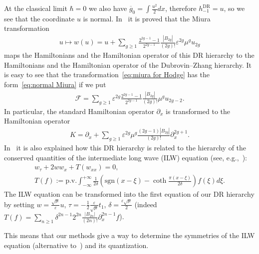 \documentclass[pdftex]{sigma}
\numberwithin{equation}{section}
\newcommand{\og}{\overline g}
\newcommand{\<}{\left<}
\renewcommand{\>}{\right>}
\newcommand{\eps}{\varepsilon}
\newcommand{\DR}{\mathrm{DR}}
\newcommand{\cF}{\mathcal F}
\begin{document}
At the classical limit $\hbar=0$ we also have $\og_0=\int\frac{u^2}{2}dx$, therefore $h_{-1}^\DR=u$, so we see that the coordinate $u$ is normal. In~\cite{Bur15} it is proved that the Miura transformation
\begin{gather}\label{eq:miura for Hodge}
u\mapsto w(u)=u+\sum_{g\ge 1}\frac{2^{2g-1}-1}{2^{2g-1}}\frac{|B_{2g}|}{(2g)!}\eps^{2g}\mu^g u_{2g}
\end{gather}
maps the Hamiltonians and the Hamiltonian operator of this DR hierarchy to the Hamiltonians and the Hamiltonian operator of the Dubrovin--Zhang hierarchy. It is easy to see that the transformation~\eqref{eq:miura for Hodge} has the form~\eqref{eq:normal Miura} if we put
\begin{gather*}
\cF=\sum_{g\ge 1}\eps^{2g}\frac{2^{2g-1}-1}{2^{2g-1}}\frac{|B_{2g}|}{(2g)!}\mu^g u_{2g-2}.
\end{gather*}
In particular, the standard Hamiltonian operator $\partial_x$ is transformed to the Hamiltonian operator
\begin{gather*}
K=\partial_x + \sum_{g\geq 1}\eps^{2g}\mu^g\frac{(2g-1) |B_{2g}|}{(2g)!} \partial_x^{2g+1}.
\end{gather*}
In~\cite{Bur15} it is also explained how this DR hierarchy is related to the hierarchy of the conserved quantities of the intermediate long wave (ILW) equation (see, e.g.,~\cite{SAK79}):
\begin{gather*}
w_\tau + 2 w w_x + T(w_{xx})=0, \\
 T(f):=\mathrm{p.v.}\int_{-\infty}^{+\infty} \frac{1}{2\delta} \left(\mathrm{sgn}(x-\xi) - \coth \frac{\pi (x-\xi)}{2 \delta}\right) f(\xi) d\xi.
\end{gather*}
The ILW equation can be transformed into the f\/irst equation of our DR hierarchy by setting $w=\frac{\sqrt\mu}{\eps} u$, $\tau=-\frac{1}{2}\frac{\eps}{\sqrt\mu} t_1$, $\delta= \frac{\eps\sqrt\mu}{2}$ (indeed $T(f)=\sum\limits_{n\geq 1} \delta^{2n-1} 2^{2n} \frac{|B_{2n}|}{(2n)!}\partial_x^{2n-1} f$).

This means that our methods give a way to determine the symmetries of the ILW equation (alternative to~\cite{SAK79}) and its quantization.
\end{document}
